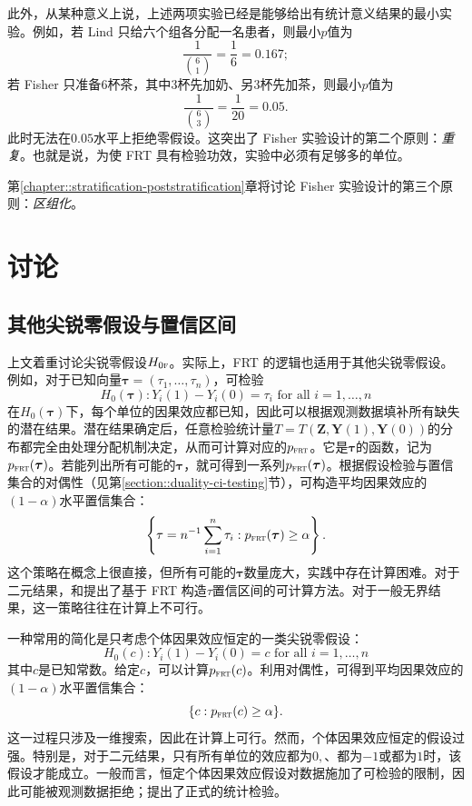  
 
 


此外，从某种意义上说，上述两项实验已经是能够给出有统计意义结果的最小实验。例如，若 Lind 只给六个组各分配一名患者，则最小$p$值为
$$
\frac{1}{\binom{6}{1}}  =\frac{1}{6} = 0.167;
$$
若 Fisher 只准备$6$杯茶，其中$3$杯先加奶、另$3$杯先加茶，则最小$p$值为
$$
\frac{1}{\binom{6}{3}} = \frac{1}{20} = 0.05.
$$
此时无法在$0.05$水平上拒绝零假设。这突出了 Fisher 实验设计的第二个原则：{\it 重复}。也就是说，为使 FRT 具有检验功效，实验中必须有足够多的单位。 

 

第\ref{chapter::stratification-poststratification}章将讨论 Fisher 实验设计的第三个原则：{\it 区组化}。


 

 

\section{讨论}

\subsection{其他尖锐零假设与置信区间}\label{sec::frt-invert-interval}


上文着重讨论尖锐零假设$H_{0\textsc{f}}$。实际上，FRT 的逻辑也适用于其他尖锐零假设。例如，对于已知向量$\bm{\tau} = (\tau_1, \ldots, \tau_n)$，可检验
$$
H_0(\bm{\tau}): Y_i(1) - Y_i(0) = \tau_i \text{ for all } i=1,\ldots, n
$$
在$H_0(\bm{\tau})$下，每个单位的因果效应都已知，因此可以根据观测数据填补所有缺失的潜在结果。潜在结果确定后，任意检验统计量$T = T(\bm{Z}, \bm{Y}(1), \bm{Y}(0))$的分布都完全由处理分配机制决定，从而可计算对应的$p_{\textsc{frt}}$。它是$\bm{\tau} $的函数，记为$p_{\textsc{frt}}(\bm{\tau} )$。若能列出所有可能的$\bm{\tau}$，就可得到一系列$p_{\textsc{frt}}(\bm{\tau} )$。根据假设检验与置信集合的对偶性（见第\ref{section::duality-ci-testing}节），可构造平均因果效应的$(1-\alpha)$水平置信集合：
$$
\left \{ \tau = n^{-1}\sum_{i=1}^n \tau_i :  p_{\textsc{frt}}(\bm{\tau} ) \geq \alpha \right \} .
$$
这个策略在概念上很直接，但所有可能的$\bm{\tau}$数量庞大，实践中存在计算困难。对于二元结果，\citet{Rigdon:2015}和\citet{li2016exact}提出了基于 FRT 构造$\tau$置信区间的可计算方法。对于一般无界结果，这一策略往往在计算上不可行。 


一种常用的简化\citep{rosenbaum2002design, Rosenbaum:2010}是只考虑个体因果效应恒定的一类尖锐零假设：
$$
H_0(c): Y_i(1) - Y_i(0) =  c\text{ for all } i=1,\ldots, n
$$
其中$c$是已知常数。给定$c$，可以计算$p_{\textsc{frt}}(c)$。利用对偶性，可得到平均因果效应的$(1-\alpha)$水平置信集合：
$$
\{ c :  p_{\textsc{frt}}(c ) \geq \alpha \} .
$$
这一过程只涉及一维搜索，因此在计算上可行。然而，个体因果效应恒定的假设过强。特别是，对于二元结果，只有所有单位的效应都为$0,$、都为$-1$或都为$1$时，该假设才能成立。一般而言，恒定个体因果效应假设对数据施加了可检验的限制，因此可能被观测数据拒绝；\citet{ding2015randomization}提出了正式的统计检验。 



